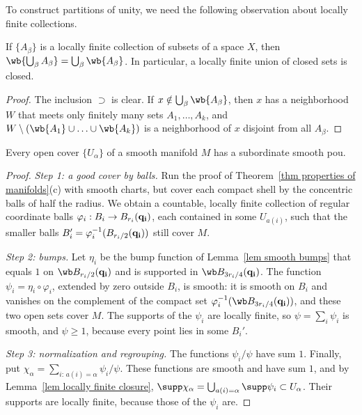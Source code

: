 To construct partitions of unity, we need the following observation about locally finite collections.

\begin{lem}\label{lem locally finite closure}
    If $\{A_\beta\}$ is a locally finite collection of subsets of a space $X$, then $\wb{\bigcup_\beta A_\beta}=\bigcup_\beta\wb{A_\beta}$. In particular, a locally finite union of closed sets is closed.
\end{lem}
\begin{proof}
    The inclusion $\supset$ is clear. If $x\notin\bigcup_\beta\wb{A_\beta}$, then $x$ has a neighborhood $W$ that meets only finitely many sets $A_1,\ldots,A_k$, and $W\setminus(\wb{A_1}\cup\ldots\cup\wb{A_k})$ is a neighborhood of $x$ disjoint from all $A_\beta$.
\end{proof}

\begin{thm}\label{prop 1.3.7 RS1}
    Every open cover $\{U_\alpha\}$ of a smooth manifold $M$ has a subordinate smooth \gls{pou}.
\end{thm}
\begin{proof}
    \emph{Step 1: a good cover by balls.} Run the proof of Theorem~\ref{thm properties of manifolds}(c) with smooth charts, but cover each compact shell by the concentric balls of half the radius. We obtain a countable, locally finite collection of regular coordinate balls $\varphi_i:B_i\to B_{r_i}(\bf{q}_i)$, each contained in some $U_{a(i)}$, such that the smaller balls $B_i'=\varphi_i^{-1}(B_{r_i/2}(\bf{q}_i))$ still cover $M$.

    \emph{Step 2: bumps.} Let $\eta_i$ be the bump function of Lemma~\ref{lem smooth bumps} that equals $1$ on $\wb B_{r_i/2}(\bf{q}_i)$ and is supported in $\wb B_{3r_i/4}(\bf{q}_i)$. The function $\psi_i=\eta_i\circ\varphi_i$, extended by zero outside $B_i$, is smooth: it is smooth on $B_i$ and vanishes on the complement of the compact set $\varphi_i^{-1}(\wb B_{3r_i/4}(\bf{q}_i))$, and these two open sets cover $M$. The supports of the $\psi_i$ are locally finite, so $\psi=\sum_i\psi_i$ is smooth, and $\psi\geq1$, because every point lies in some $B_i'$.

    \emph{Step 3: normalization and regrouping.} The functions $\psi_i/\psi$ have sum $1$. Finally, put $\chi_\alpha=\sum_{i:\,a(i)=\alpha}\psi_i/\psi$. These functions are smooth and have sum $1$, and by Lemma~\ref{lem locally finite closure}, $\supp\chi_\alpha=\bigcup_{a(i)=\alpha}\supp\psi_i\subset U_\alpha$. Their supports are locally finite, because those of the $\psi_i$ are.
\end{proof}

